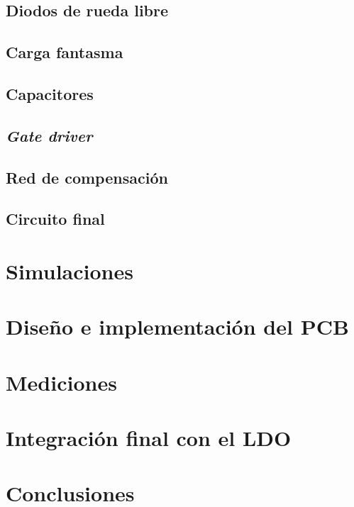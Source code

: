 \documentclass[a4paper,12pt]{article}
\begin{document}
\subsection{Diodos de rueda libre}

\subsection{Carga fantasma}

\subsection{Capacitores}

\subsection{\textit{Gate driver}}



\subsection{Red de compensación}

\subsection{Circuito final}


\section{Simulaciones}


\section{Diseño e implementación del PCB}


\section{Mediciones}


\section{Integración final con el LDO}


\section{Conclusiones}



\end{document}
